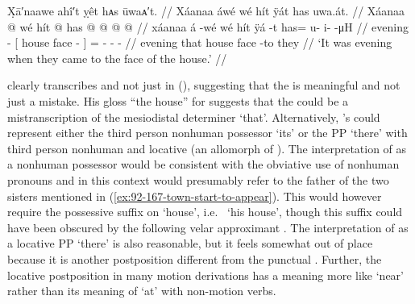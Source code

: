 
\ex\label{ex:92-169-evening-came-to-house}%
%
\begingl
	\glpreamble	X̣ā′naawe ahî′t ỵêt hᴀs ūwaᴀ′t. //
	\glpreamble	Xáanaa áwé wé hít ÿát has uwa.át. //
	\gla	Xáanaa  @ {}
		{} wé hít  @ {} {}
		has @  @ {} @ {} @ {} //
	\glb	xáanaa á -wé
		{} wé hít ÿá -t {}
		has= u- i-  -μH //
	\glc	evening  -
		{}[  house face - {}]
		= - -  - //
	\gld	evening  {}
		{} that house face -to {}
		they  {} {} {} //
	\glft	‘It was evening when they came to the face of the house.’
		//
\endgl
\xe

\citeauthor{swanton:1909} clearly transcribes  and not just  in (\lastx), suggesting that the  is meaningful and not just a mistake.
His gloss “the house” for  suggests that the  could be a mistranscription of the mesiodistal determiner  ‘that’.
Alternatively, \citeauthor{swanton:1909}’s  could represent either the third person nonhuman possessor  ‘its’ or the PP  ‘there’ with third person nonhuman  and locative  (an allomorph of ).
The interpretation of  as a nonhuman possessor would be consistent with the obviative use of nonhuman pronouns and in this context would presumably refer to the father of the two sisters mentioned in (\ref{ex:92-167-town-start-to-appear}).
This would however require the possessive suffix  on  ‘house’, i.e.\  ‘his house’, though this suffix could have been obscured by the following velar approximant .
The interpretation of  as a locative PP  ‘there’ is also reasonable, but it feels somewhat out of place because it is another postposition different from the punctual .
Further, the locative postposition in many motion derivations has a meaning more like ‘near’ rather than its meaning of ‘at’ with non-motion verbs.

